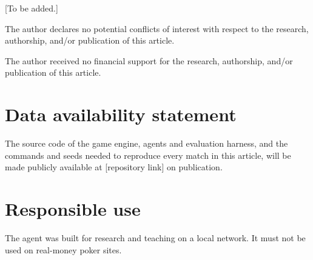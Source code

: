 \begin{acks}{[To be added.]}
\end{acks}

\begin{dci}{The author declares no potential conflicts of interest with respect to the research,
authorship, and/or publication of this article.}
\end{dci}

\begin{funding}{The author received no financial support for the research, authorship, and/or publication
of this article.}
\end{funding}

\section*{Data availability statement}
The source code of the game engine, agents and evaluation harness, and the commands and seeds
needed to reproduce every match in this article, will be made publicly available
at [repository link] on publication.

\section*{Responsible use}
The agent was built for research and teaching on a local network. It must not be used on
real-money poker sites.


